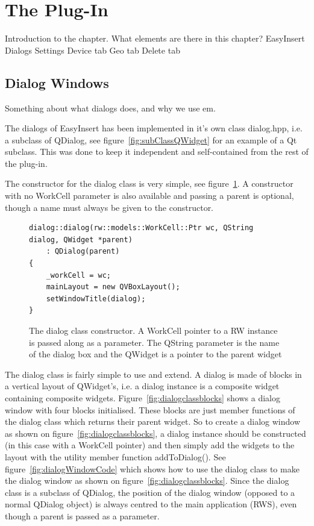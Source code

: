 \section{The Plug-In}
Introduction to the chapter.
	What elements are there in this chapter?		
		EasyInsert
		Dialogs
		Settings		
		Device tab
		Geo tab
		Delete tab


\subsection{Dialog Windows}
Something about what dialogs does, and why we use em.

The dialogs of EasyInsert has been implemented in it's own class dialog.hpp, i.e. a subclass of QDialog, see figure~\ref{fig:subClassQWidget} for an example of a Qt subclass. This was done to keep it independent and self-contained from the rest of the plug-in. 

The constructor for the dialog class is very simple, see figure~\ref{fig:dialogConstructor}. A constructor with no WorkCell parameter is also available and passing a parent is optional, though a name must always be given to the constructor. 

\begin{figure}[h]
\centering
\lstset{language=C++} 
\begin{lstlisting}[frame=single]  
dialog::dialog(rw::models::WorkCell::Ptr wc, QString dialog, QWidget *parent)
    : QDialog(parent)
{
    _workCell = wc;
    mainLayout = new QVBoxLayout();
    setWindowTitle(dialog);
}			 
\end{lstlisting}
\caption{The dialog class constructor. A WorkCell pointer to a RW instance is passed along as a parameter. The QString parameter is the name of the dialog box and the QWidget is a pointer to the parent widget }
\label{fig:dialogConstructor} 	
\end{figure}

The dialog class is fairly simple to use and extend. A dialog is made of blocks in a vertical layout of QWidget's, i.e. a dialog instance is a composite widget containing composite widgets. Figure~\ref{fig:dialogclassblocks} shows a dialog window with four blocks initialised. These blocks are just member functions of the dialog class which returns their parent widget. So to create a dialog window as shown on figure~\ref{fig:dialogclassblocks}, a dialog instance should be constructed (in this case with a WorkCell pointer) and then simply add the widgets to the layout with the utility member function addToDialog(). See figure~\ref{fig:dialogWindowCode} which shows how to use the dialog class to make the dialog window as shown on figure~\ref{fig:dialogclassblocks}. Since the dialog class is a subclass of QDialog, the position of the dialog window (opposed to a normal QDialog object) is always centred to the main application (RWS), even though a parent is passed as a parameter.

